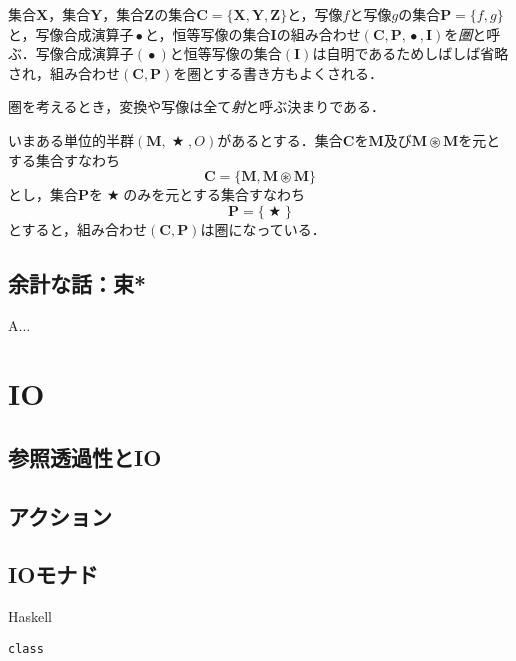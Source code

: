 \documentclass[twocolumn]{jsbook}
\newcommand{\programminglanguage}[1]{\textsf{#1}}
\newcommand{\haskell}{\programminglanguage{Haskell}}
\newcommand{\keyword}[1]{{\emph{#1}}}
\newenvironment{haskellcode}{\begin{itembox}[r]{\haskell}}{\end{itembox}}
\DeclareMathOperator{\mathAnyBinaryOperator}{\bigstar}
\DeclareMathOperator{\mathCompose}{\bullet}
\DeclareMathOperator{\mathSetTimes}{\circledast}
\newcommand{\mathSet}[1]{\mathbf{#1}} %
\newcommand{\mathCategoryShort}[2]{(#1,#2)}
\newcommand{\mathMonoid}[3]{(#1,#2,#3)}
\newcommand{\mathCategory}[4]{(#1,#2,#3,#4)}
\begin{document}
集合$\mathSet{X}$，集合$\mathSet{Y}$，集合$\mathSet{Z}$の集合$\mathSet{C}=\{\mathSet{X},\mathSet{Y},\mathSet{Z}\}$と，写像$f$と写像$g$の集合$\mathSet{P}=\{f,g\}$と，写像合成演算子$\mathCompose$と，恒等写像の集合$\mathSet{I}$の組み合わせ$\mathCategory{\mathSet{C}}{\mathSet{P}}{\mathCompose}{\mathSet{I}}$を\keyword{圏}と呼ぶ．写像合成演算子$(\mathCompose)$と恒等写像の集合$(\mathSet{I})$は自明であるためしばしば省略され，組み合わせ$\mathCategoryShort{\mathSet{C}}{\mathSet{P}}$を圏とする書き方もよくされる．

圏を考えるとき，変換や写像は全て\keyword{射}と呼ぶ決まりである．

いまある単位的半群$\mathMonoid{\mathSet{M}}{\mathAnyBinaryOperator}{O}$があるとする．集合$\mathSet{C}$を$\mathSet{M}$及び$\mathSet{M}\mathSetTimes\mathSet{M}$を元とする集合すなわち
\begin{equation}
\mathSet{C}=\{\mathSet{M},\mathSet{M}\mathSetTimes\mathSet{M}\}
\end{equation}
とし，集合$\mathSet{P}$を$\mathAnyBinaryOperator$のみを元とする集合すなわち
\begin{equation}
\mathSet{P}=\{\mathAnyBinaryOperator\}
\end{equation}
とすると，組み合わせ$\mathCategoryShort{\mathSet{C}}{\mathSet{P}}$は圏になっている．

\section{余計な話：束*}

A...


\chapter{IO}

\section{参照透過性とIO}

\section{アクション}

\section{IOモナド}

\begin{haskellcode}
\begin{verbatim}
class
\end{verbatim}
\end{haskellcode}
\end{document}
